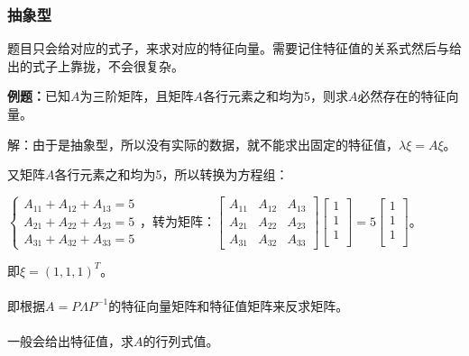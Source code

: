 \subsubsection{抽象型}

题目只会给对应的式子，来求对应的特征向量。需要记住特征值的关系式然后与给出的式子上靠拢，不会很复杂。

\textbf{例题：}已知$A$为三阶矩阵，且矩阵$A$各行元素之和均为5，则求$A$必然存在的特征向量。

解：由于是抽象型，所以没有实际的数据，就不能求出固定的特征值，$\lambda\xi=A\xi$。

又矩阵$A$各行元素之和均为5，所以转换为方程组：\medskip

$\left\{\begin{array}{l}
    A_{11}+A_{12}+A_{13}=5 \\
    A_{21}+A_{22}+A_{23}=5 \\
    A_{31}+A_{32}+A_{33}=5
\end{array}\right.$，转为矩阵：$\left[\begin{array}{ccc}
    A_{11} & A_{12} & A_{13} \\
    A_{21} & A_{22} & A_{23} \\
    A_{31} & A_{32} & A_{33}
\end{array}\right]\left[\begin{array}{c}
    1 \\
    1 \\
    1 \\
\end{array}\right]=5\left[\begin{array}{c}
    1 \\
    1 \\
    1 \\
\end{array}\right]$。\medskip

即$\xi=(1,1,1)^T$。

\paragraph{}

即根据$A=P\Lambda P^{-1}$的特征向量矩阵和特征值矩阵来反求矩阵。

\paragraph{}

一般会给出特征值，求$A$的行列式值。

